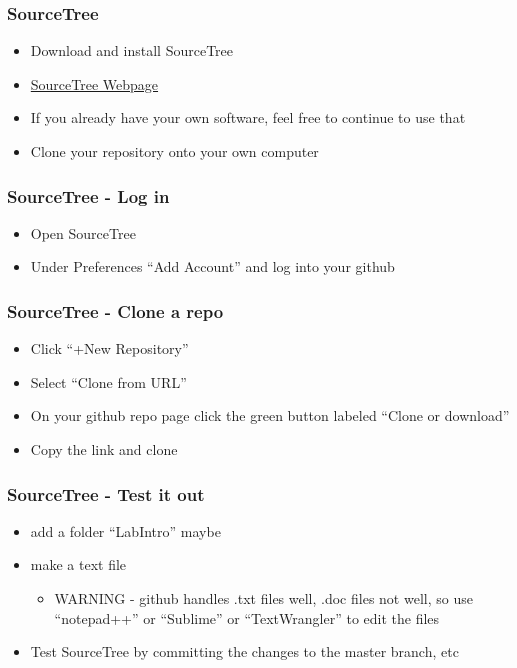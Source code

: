 \documentclass[14pt]{beamer}
\begin{document}
\begin{frame}
\frametitle{SourceTree}
\begin{itemize}
	\item Download and install SourceTree
	\item \href{https://www.sourcetreeapp.com/}{SourceTree Webpage}
	\item If you already have your own software, feel free to continue to use that
	\item Clone your repository onto your own computer
\end{itemize}
\end{frame}

\begin{frame}
\frametitle{SourceTree - Log in}
\begin{itemize}
	\item Open SourceTree
	\item Under Preferences ``Add Account'' and log into your github
\end{itemize}
\end{frame}

\begin{frame}
\frametitle{SourceTree - Clone a repo}
\begin{itemize}
	\item Click ``+New Repository''
	\item Select ``Clone from URL''
	\item On your github repo page click the green button labeled ``Clone or download''
	\item Copy the link and clone
\end{itemize}
\end{frame}

\begin{frame}
\frametitle{SourceTree - Test it out}
\begin{itemize}
	\item add a folder ``LabIntro'' maybe
	\item make a text file
	\begin{itemize}
		\item WARNING - github handles .txt files well, .doc files not well, so use ``notepad++'' or ``Sublime'' or ``TextWrangler'' to edit the files
	\end{itemize}
	\item Test SourceTree by committing the changes to the master branch, etc
\end{itemize}
\end{frame}
\end{document}
